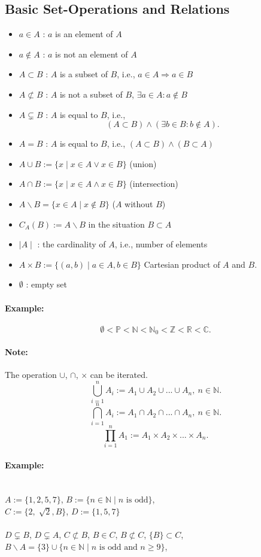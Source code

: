 \documentclass[twocolumn]{article}
\begin{document}
	\subsection{Basic Set-Operations and Relations}
		\begin{itemize}%
		\renewcommand{\labelitemi}{$\rightarrow$}
		\item $a\in A$ : $a$ is an element of $A$ 
		\item $a\not\in A$ : $a$ is not an element of $A$ 
		\item $A\subset B$ : $A$ is a subset of $B$, i.e., $a\in A\Rightarrow a\in B$  
		\item $A\not\subset B$ : $A$ is not a subset of $B$,  
			$\exists a\in A:a\not\in B$
		\item $A\subsetneq B$ : $A$ is equal to $B$, i.e.,
			\[
			(A\subset B)\wedge(\exists b\in B:b\not\in A)
			.\] 
		\item $A=B$ : $A$ is equal to $B$, i.e., $(A\subset B)\wedge(B\subset A)$
		\item $A\cup B:=\{x\mid x\in A\vee x\in B\}$ (union)
		\item $A\cap B:=\{x\mid x\in A \wedge x\in B\}$ (intersection) 
		\item $A\backslash B=\{x\in A\mid x\not\in B\}$ ($A$ without $B$)
		\item $C_A(B):=A\backslash B$ in the situation $B\subset A$ 
		\item $\mid A\mid$ : the cardinality of $A$, i.e., number of elements
		\item $A\times B:=\{(a,b)\mid a\in A,b\in B\}$ Cartesian product of $A$ and $B$.
		\item $\emptyset$ : empty set
		\end{itemize}
			\paragraph{Example:}
				\[
				\emptyset <\mathbb P<\mathbb N<\mathbb N_0<\mathbb Z<
				\mathbb R<\mathbb C
				.\] 
			\paragraph{Note:}
				The operation $\cup$, $\cap$, $\times$ can be iterated.
				\[
				\bigcup_{i=1}^nA_i:=A_1\cup A_2\cup...\cup A_n,~n\in\mathbb N
				.\] 
				\[
				\bigcap_{i=1}^{n}A_i:=A_1\cap A_2\cap...\cap A_n,~n\in\mathbb N
				.\] 
				\[
				\prod_{i=1}^{n}A_1:=A_1\times A_2\times...\times A_n
				.\] 
			\paragraph{Example:}\mbox{}\\
				$A:=\{1,2,5,7\}$,   $B:=\{n\in\mathbb N\mid n\mbox{ is odd}\}$,
				\\
				$C:=\{2,\sqrt[]{2},B\}$,   $D:=\{1,5,7\}$ 
				\\\\
				$D\subsetneq B$, $D\subsetneq A$, $C\not\subset B$, 
				$B\in C$, $B\not\subset C$, $\{B\}\subset C$, 
				$B\backslash A=\{3\}\cup\{n\in\mathbb N\mid n\mbox{ is odd
				and }n\ge9\}$,\\
				
\end{document}
